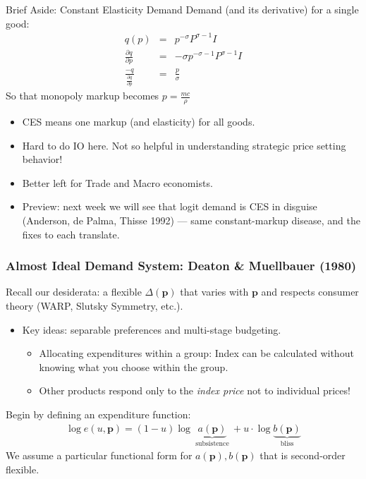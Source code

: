 \documentclass[aspectratio=169,11pt]{beamer}
\begin{document}
\begin{frame}{Brief Aside: Constant Elasticity Demand}
Demand (and its derivative) for a single good:
\begin{eqnarray*}
q(p) &=& p^{-\sigma} P^{\sigma-1} I \\
\frac{\partial q}{\partial p} &=& -\sigma p^{-\sigma-1} P^{\sigma-1} I\\
\frac{-q}{\frac{\partial q}{\partial p} } &=& \frac{p}{\sigma}
\end{eqnarray*}
So that monopoly markup becomes $ p = \frac{ mc}{\rho}$
\begin{itemize}
\item CES means one markup (and elasticity) for all goods.
\item Hard to do IO here. Not so helpful in understanding strategic price setting behavior!
\item Better left for Trade and Macro economists.
\item Preview: next week we will see that logit demand \alert{is} CES in disguise (Anderson, de Palma, Thisse 1992) --- same constant-markup disease, and the fixes to each translate.
\end{itemize}
\end{frame}



\begin{frame}
\frametitle{Almost Ideal Demand System: Deaton \& Muellbauer (1980)}
Recall our desiderata: a flexible $\Delta(\symbf{p})$ that varies with $\symbf{p}$ and respects consumer theory (WARP, Slutsky Symmetry, etc.).
\begin{itemize}
\item Key ideas: \alert{separable preferences} and \alert{multi-stage budgeting}.
\begin{itemize}
\item Allocating expenditures within a group: Index can be calculated without knowing what you choose within the group.
\item Other products respond only to the \textit{index price} not to individual prices!
\end{itemize}
\end{itemize}
Begin by defining an expenditure function:
\begin{eqnarray*}
\log e(u,\symbf{p}) = (1- u) \log \underbrace{a(\symbf{p})}_{\text{ subsistence }} + u \cdot \log \underbrace{b(\symbf{p})}_{\text{ bliss }}
\end{eqnarray*}
We assume a particular functional form for $a(\symbf{p}),b(\symbf{p})$ that is second-order flexible.
\end{frame}
\end{document}
